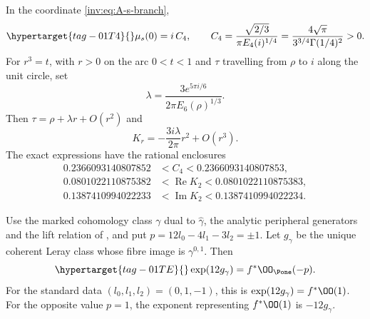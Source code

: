 \begin{proposition}\hypertarget{tag-01RV}{}\label{inv:A2.2}

In the coordinate \eqref{inv:eq:A-s-branch},
\begin{equation}\hypertarget{tag-01T4}{}\label{inv:eq:A-mu-value}
\mu_s(0)=i\,C_4,
\qquad
C_4=\frac{\sqrt{2/3}}{\pi E_4(i)^{1/4}}
=\frac{4\sqrt\pi}{3^{3/4}\Gamma(1/4)^2}>0.
\end{equation}
For $r^3=t$, with $r>0$ on the arc $0<t<1$ and $\tau$ travelling
from $\rho$ to $i$ along the unit circle, set
\[
\lambda=\frac{3e^{5\pi i/6}}{2\pi E_6(\rho)^{1/3}}.
\]
Then $\tau=\rho+\lambda r+O(r^2)$ and
\[
K_r=-\frac{3i\lambda}{2\pi}r^2+O(r^3).
\]
The exact expressions have the rational enclosures
\[
\begin{aligned}
0.2366093140807852&<C_4<0.2366093140807853,\\
0.0801022110875382&<\operatorname{Re}K_2<0.0801022110875383,\\
0.1387410994022233&<\operatorname{Im}K_2<0.1387410994022234.
\end{aligned}
\]
\end{proposition}

\begin{proposition}\hypertarget{tag-01SF}{}\label{inv:C3.2}\label{wb:lem:bcpr-degree-one-input}

Use the marked cohomology class $\gamma$ dual to
$\hat\gamma$, the analytic peripheral generators and the lift relation of
\cite[\S7.5, pp.~54--57, especially (7.10), p.~55]{AC2026}, and put
$p=12l_0-4l_1-3l_2=\pm1$.  Let $g_\gamma$ be the unique coherent
Leray class whose fibre image is $\gamma^{0,1}$.  Then
\begin{equation}\hypertarget{tag-01TE}{}\label{inv:eq:C-factor12}
\exp(12g_\gamma)=f^*\OO_{\Pone}(-p).
\end{equation}
For the standard data $(l_0,l_1,l_2)=(0,1,-1)$, this is
$\exp(12g_\gamma)=f^*\OO(1)$.  For the opposite value $p=1$,
the exponent representing $f^*\OO(1)$ is $-12g_\gamma$.
\end{proposition}

